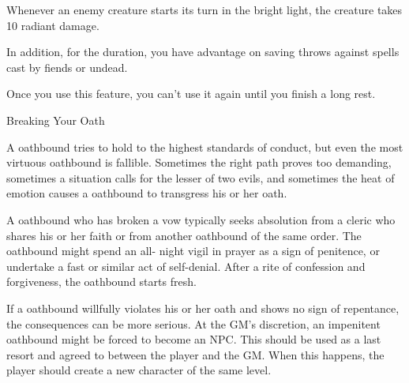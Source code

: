 Whenever an enemy creature starts its turn in the bright light, the creature takes 10 radiant damage.

In addition, for the duration, you have advantage on saving throws against spells cast by fiends or undead.

Once you use this feature, you can't use it again until you finish a long rest.

\begin{DndComment}{Breaking Your Oath}

A oathbound tries to hold to the highest standards of conduct, but even the most virtuous oathbound is fallible. Sometimes the right path proves too demanding, sometimes a situation calls for the lesser of two evils, and sometimes the heat of emotion causes a oathbound to transgress his or her oath.

A oathbound who has broken a vow typically seeks absolution from a cleric who shares his or her faith or from another oathbound of the same order. The oathbound might spend an all- night vigil in prayer as a sign of penitence, or undertake a fast or similar act of self-denial. After a rite of confession and forgiveness, the oathbound starts fresh.

If a oathbound willfully violates his or her oath and shows no sign of repentance, the consequences can be more serious. At the GM's discretion, an impenitent oathbound might be forced to become an NPC. This should be used as a last resort and agreed to between the player and the GM. When this happens, the player should create a new character of the same level.
\end{DndComment}

